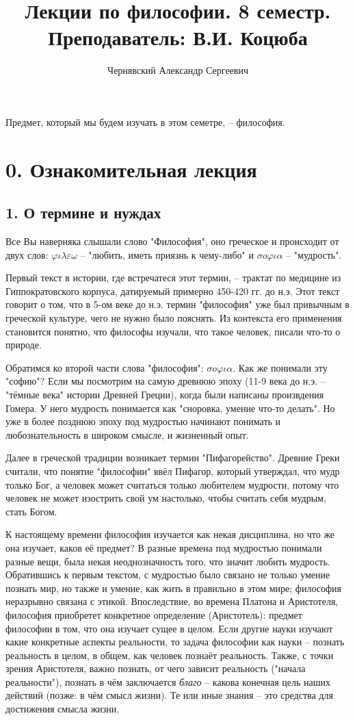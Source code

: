\documentclass[a4paper, 12pt]{book} %
\author{Чернявский Александр Сергеевич}
\title {Лекции по философии. 8 семестр. Преподаватель: В.И. Коцюба}
\begin{document}
\maketitle
\newpage

Предмет, который мы будем изучать в этом семетре, -- философия. 

\section*{0. Ознакомительная лекция}
\subsection*{1. О термине и нуждах}
Все Вы наверняка слышали слово "Философия", оно греческое и происходит от двух слов: $\varphi \iota \lambda \varepsilon \omega $ -- "любить, иметь приязнь к чему-либо" и
 $\sigma o \varphi \iota \alpha$ -- "мудрость".
 
Первый текст в истории, где встречатеся этот  термин, -- трактат по медицине из Гиппократовского корпуса, датируемый примерно 450-420 гг. до н.э. Этот текст говорит о том, что в 5-ом веке до н.э. термин "философия" уже был привычным в греческой культуре, чего не нужно было пояснять. Из контекста его применения становится понятно, что философы изучали, что такое человек, писали что-то о природе. 

Обратимся ко второй части слова "философия": $\sigma o \varphi \iota \alpha$. Как же понимали эту "софию"? Если мы посмотрим на самую древнюю эпоху (11-9 века до н.э. -- "тёмные века" истории Древней Греции), когда были написаны произвдения Гомера. У него мудрость понимается как "сноровка, умение что-то делать". Но уже в более позднюю эпоху под мудростью начинают понимать и любознательность в широком смысле, и жизненный опыт.

Далее в греческой традиции возникает термин "Пифагорейство". Древние Греки считали, что понятие "философии" ввёл Пифагор, который утверждал, что мудр только Бог, а человек может считаться только любителем мудрости, потому что человек не может изострить свой ум настолько, чтобы считать себя мудрым, стать Богом. 

К настоящему времени философия изучается как некая дисциплина, но что же она изучает, каков её предмет? В разные времена под мудростью понимали разные вещи, была некая неоднозначность того, что значит любить мудрость. Обратившись к первым текстом, с мудростью было связано не только умение познать мир, но также и умение, как жить в правильно в этом мире; философия неразрывно связана с этикой. Впоследствие, во времена Платона и Аристотеля, философия приобретет конкретное определение (Аристотель): предмет философии в том, что она изучает сущее в целом. Если другие науки изучают какие конкретные аспекты реальности, то задача философии как науки -- познать реальность в целом, в общем, как человек познаёт реальность. Также, с точки зрения Аристотеля, важно познать, от чего зависит реальность ("начала реальности"), познать в чём заключается \textit{благо} -- какова конечная цель наших действий (позже: в чём смысл жизни). Те или иные знания -- это средства для достижения смысла жизни. 
\end{document}
